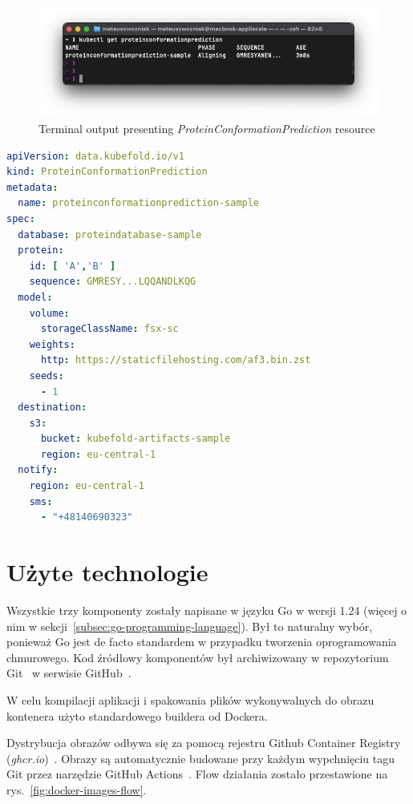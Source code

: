 \begin{figure}[htbp]
    \centering
    \includegraphics[width=\textwidth]{images/proteinconformationprediction_terminal}
    \caption{Terminal output presenting \textit{ProteinConformationPrediction} resource}
    \label{fig:proteinconformationprediction_terminal}
\end{figure}

\begin{lstlisting}[language=yaml,caption={Przykładowy kod YAML zasobu ProteinConformationPrediction},label={lst:protein_conformation_prediction}]
apiVersion: data.kubefold.io/v1
kind: ProteinConformationPrediction
metadata:
  name: proteinconformationprediction-sample
spec:
  database: proteindatabase-sample
  protein:
    id: [ 'A','B' ]
    sequence: GMRESY...LQQANDLKQG
  model:
    volume:
      storageClassName: fsx-sc
    weights:
      http: https://staticfilehosting.com/af3.bin.zst
    seeds:
      - 1
  destination:
    s3:
      bucket: kubefold-artifacts-sample
      region: eu-central-1
  notify:
    region: eu-central-1
    sms:
      - "+48140690323"
\end{lstlisting}


\section{Użyte technologie}
Wszystkie trzy komponenty zostały napisane w języku Go w wersji 1.24 (więcej o nim w sekcji~\ref{subsec:go-programming-language}).
Był to naturalny wybór, ponieważ Go jest de facto standardem w przypadku tworzenia oprogramowania chmurowego.
Kod źródłowy komponentów był archiwizowany w repozytorium Git~\cite{git} w serwisie GitHub~\cite{github}.

W celu kompilacji aplikacji i spakowania plików wykonywalnych do obrazu kontenera użyto standardowego buildera od Dockera.

Dystrybucja obrazów odbywa się za pomocą rejestru Github Container Registry (\textit{ghcr.io})~\cite{ghcr}.
Obrazy są automatycznie budowane przy każdym wypchnięciu tagu Git przez narzędzie GitHub Actions~\cite{github_actions}.
Flow działania zostało przestawione na rys.~\ref{fig:docker-images-flow}.

